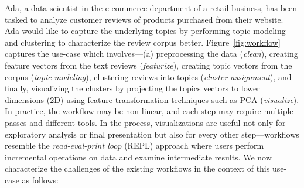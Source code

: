 


Ada, a data scientist in the e-commerce department of a retail business, has been tasked to analyze customer reviews of products purchased from their website. Ada would like to capture the underlying topics by performing topic modeling and clustering to characterize the review corpus better. Figure~\ref{fig:workflow} captures the use-case which involves---(a) preprocessing the data (\emph{clean}), creating feature vectors from the text reviews (\emph{featurize}), creating topic vectors from the corpus (\emph{topic modeling}), clustering reviews into topics (\emph{cluster assignment}), and finally, visualizing the clusters by projecting the topics vectors to lower dimensions (2D) using feature transformation techniques such as PCA (\emph{visualize}). In practice, the workflow may be non-linear, and each step may require multiple passes and different tools. In the process, visualizations are useful not only for exploratory analysis or final presentation but also for every other step---\vita workflows resemble the \emph{read-eval-print loop} (REPL) approach where users perform incremental operations on data and examine intermediate results. We now characterize the challenges of the existing \vita  workflows in the context of this use-case as follows:

